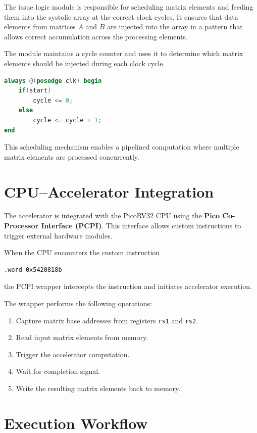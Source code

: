 ﻿\documentclass[12pt,a4paper]{report}
\begin{document}
The issue logic module is responsible for scheduling matrix elements and feeding them into the systolic array at the correct clock cycles. 
It ensures that data elements from matrices $A$ and $B$ are injected into the array in a pattern that allows correct accumulation across the processing elements.

The module maintains a cycle counter and uses it to determine which matrix elements should be injected during each clock cycle.

\begin{lstlisting}[language=Verilog]
always @(posedge clk) begin
    if(start)
        cycle <= 0;
    else
        cycle <= cycle + 1;
end
\end{lstlisting}

This scheduling mechanism enables a pipelined computation where multiple matrix elements are processed concurrently.

\section{CPU–Accelerator Integration}

The accelerator is integrated with the PicoRV32 CPU using the \textbf{Pico Co-Processor Interface (PCPI)}. 
This interface allows custom instructions to trigger external hardware modules.

When the CPU encounters the custom instruction

\begin{verbatim}
.word 0x5420818b
\end{verbatim}

the PCPI wrapper intercepts the instruction and initiates accelerator execution.

The wrapper performs the following operations:

\begin{enumerate}
    \item Capture matrix base addresses from registers \texttt{rs1} and \texttt{rs2}.
    \item Read input matrix elements from memory.
    \item Trigger the accelerator computation.
    \item Wait for completion signal.
    \item Write the resulting matrix elements back to memory.
\end{enumerate}

\section{Execution Workflow}
\end{document}
